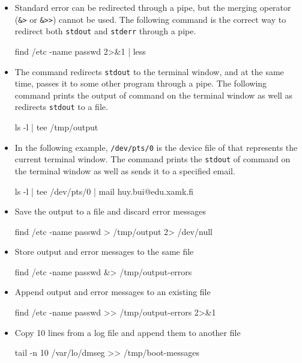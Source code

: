 \begin{itemize}
\item Standard error can be redirected through a pipe, but the merging operator (\verb|&>| or \verb|&>>|) cannot be used. The following command is the correct way to redirect both \verb|stdout| and \verb|stderr| through a pipe.
\begin{commandshell}
find /etc -name passwd 2>&1 | less
\end{commandshell}

\item The  command redirects \verb|stdout| to the terminal window, and at the same time, passes it to some other program through a pipe. The following command prints the output of  command on the terminal window as well as redirects \verb|stdout| to a file.
\begin{commandshell}
ls -l | tee /tmp/output
\end{commandshell}

\item In the following example,  \verb|/dev/pts/0| is the device file of that represents the current terminal window. The command prints the \verb|stdout| of  command on the terminal window as well as sends it to a specified email.
\begin{commandshell}
ls -l | tee /dev/pts/0 | mail huy.bui@edu.xamk.fi
\end{commandshell}

\item Save the output to a file and discard error messages
\begin{commandshell}
find /etc -name passwd > /tmp/output 2> /dev/null
\end{commandshell}

\item Store output and error messages to the same file
\begin{commandshell}
find /etc -name passwd &> /tmp/output-errors
\end{commandshell}

\item Append output and error messages to an existing file
\begin{commandshell}
find /etc -name passwd >> /tmp/output-errors 2>&1
\end{commandshell}

\item Copy 10 lines from a log file and append them to another file
\begin{commandshell}
tail -n 10 /var/lo/dmseg >> /tmp/boot-messages
\end{commandshell}


\end{itemize}
